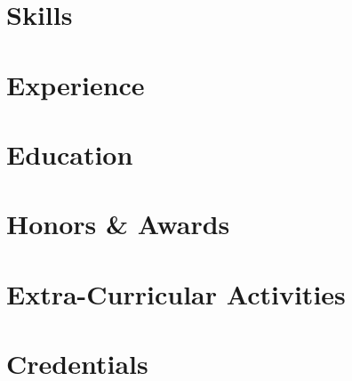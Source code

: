 \documentclass[letter,10pt]{article}
\begin{document}


\section{Skills}


\section{Experience}


\section{Education}


\section{Honors \& Awards}


\section{Extra-Curricular Activities}


\section{Credentials}
% 

\end{document}
